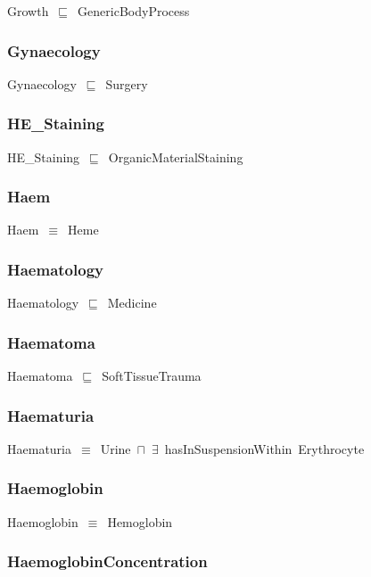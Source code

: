 \documentclass{article}
\begin{document}
Growth~\ensuremath{\sqsubseteq}~GenericBodyProcess~

\subsubsection*{Gynaecology}

Gynaecology~\ensuremath{\sqsubseteq}~Surgery~

\subsubsection*{HE_Staining}

HE\_Staining~\ensuremath{\sqsubseteq}~OrganicMaterialStaining~

\subsubsection*{Haem}

Haem~\ensuremath{\equiv}~Heme

\subsubsection*{Haematology}

Haematology~\ensuremath{\sqsubseteq}~Medicine~

\subsubsection*{Haematoma}

Haematoma~\ensuremath{\sqsubseteq}~SoftTissueTrauma~

\subsubsection*{Haematuria}

Haematuria~\ensuremath{\equiv}~Urine~\ensuremath{\sqcap}~\ensuremath{\exists}~hasInSuspensionWithin~Erythrocyte

\subsubsection*{Haemoglobin}

Haemoglobin~\ensuremath{\equiv}~Hemoglobin

\subsubsection*{HaemoglobinConcentration}
\end{document}
